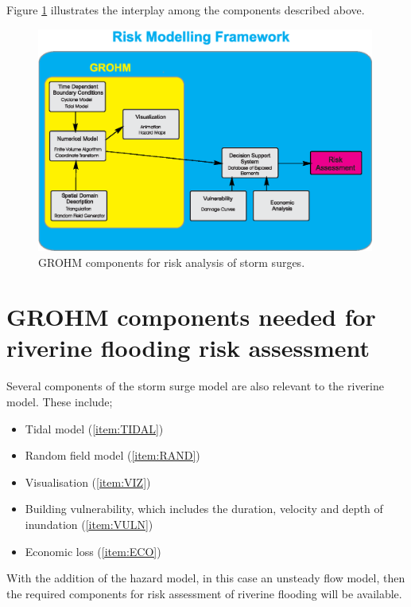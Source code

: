 \documentclass{article}
\begin{document}
Figure \ref{fig:flowchart} illustrates the interplay among the
components described above.
\begin{figure}
  \begin{center}
    \includegraphics[width = 0.99\textwidth]{GROHM}    
  \end{center}

  \caption{GROHM components for risk analysis of storm surges.}
  \label{fig:flowchart}
\end{figure}

\section{GROHM components needed for riverine flooding risk assessment}

Several components of the storm surge model are also relevant to
the riverine model. These include;

\begin{itemize} 
   \item Tidal model (\ref{item:TIDAL}) 
   \item Random field model (\ref{item:RAND}) 
   \item Visualisation (\ref{item:VIZ})   
   \item Building vulnerability, which includes the duration, velocity and depth of inundation (\ref{item:VULN})  
   \item Economic loss (\ref{item:ECO})   
\end{itemize} 

With the addition of the hazard model, in this case an unsteady
flow model, then the required components for risk assessment of
riverine flooding will be available.
\end{document}
